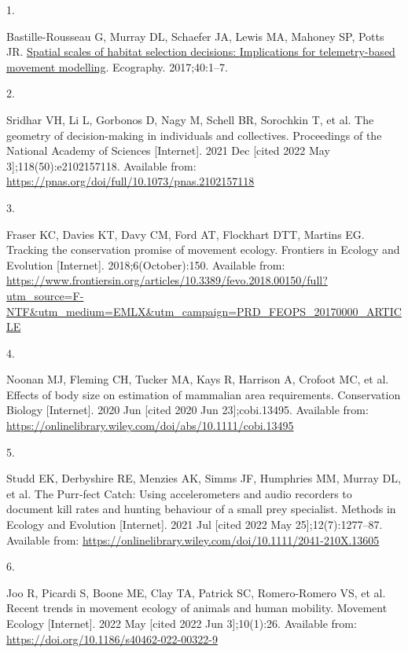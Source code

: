 \documentclass[10pt,a4paper]{article}
\newlength{\cslhangindent}
\newlength{\csllabelwidth}
\newlength{\cslentryspacingunit} %
\newenvironment{CSLReferences}[2] %
 {%
  \setlength{\parindent}{0pt}
  \ifodd #1
  \let\oldpar\par
  \def\par{\hangindent=\cslhangindent\oldpar}
  \fi
  \setlength{\parskip}{#2\cslentryspacingunit}
 }%
 {}
\newcommand{\CSLLeftMargin}[1]{\parbox[t]{\csllabelwidth}{#1}}
\newcommand{\CSLRightInline}[1]{\parbox[t]{\linewidth - \csllabelwidth}{#1}\break}
\begin{document}
\hypertarget{refs}{}
\begin{CSLReferences}{0}{0}
\leavevmode{}%
\CSLLeftMargin{1. }
\CSLRightInline{Bastille-Rousseau G, Murray DL, Schaefer JA, Lewis MA, Mahoney SP, Potts JR. \href{https://doi.org/10.1111/ecog.02655}{Spatial scales of habitat selection decisions: {Implications} for telemetry-based movement modelling}. Ecography. 2017;40:1--7. }

\leavevmode{}%
\CSLLeftMargin{2. }
\CSLRightInline{Sridhar VH, Li L, Gorbonos D, Nagy M, Schell BR, Sorochkin T, et al. The geometry of decision-making in individuals and collectives. Proceedings of the National Academy of Sciences {[}Internet{]}. 2021 Dec {[}cited 2022 May 3{]};118(50):e2102157118. Available from: \url{https://pnas.org/doi/full/10.1073/pnas.2102157118}}

\leavevmode{}%
\CSLLeftMargin{3. }
\CSLRightInline{Fraser KC, Davies KT, Davy CM, Ford AT, Flockhart DTT, Martins EG. Tracking the conservation promise of movement ecology. Frontiers in Ecology and Evolution {[}Internet{]}. 2018;6(October):150. Available from: \url{https://www.frontiersin.org/articles/10.3389/fevo.2018.00150/full?utm_source=F-NTF\&utm_medium=EMLX\&utm_campaign=PRD_FEOPS_20170000_ARTICLE}}

\leavevmode{}%
\CSLLeftMargin{4. }
\CSLRightInline{Noonan MJ, Fleming CH, Tucker MA, Kays R, Harrison A, Crofoot MC, et al. Effects of body size on estimation of mammalian area requirements. Conservation Biology {[}Internet{]}. 2020 Jun {[}cited 2020 Jun 23{]};cobi.13495. Available from: \url{https://onlinelibrary.wiley.com/doi/abs/10.1111/cobi.13495}}

\leavevmode{}%
\CSLLeftMargin{5. }
\CSLRightInline{Studd EK, Derbyshire RE, Menzies AK, Simms JF, Humphries MM, Murray DL, et al. The {Purr}‐fect {Catch}: {Using} accelerometers and audio recorders to document kill rates and hunting behaviour of a small prey specialist. Methods in Ecology and Evolution {[}Internet{]}. 2021 Jul {[}cited 2022 May 25{]};12(7):1277--87. Available from: \url{https://onlinelibrary.wiley.com/doi/10.1111/2041-210X.13605}}

\leavevmode{}%
\CSLLeftMargin{6. }
\CSLRightInline{Joo R, Picardi S, Boone ME, Clay TA, Patrick SC, Romero-Romero VS, et al. Recent trends in movement ecology of animals and human mobility. Movement Ecology {[}Internet{]}. 2022 May {[}cited 2022 Jun 3{]};10(1):26. Available from: \url{https://doi.org/10.1186/s40462-022-00322-9}}


\end{CSLReferences}
\end{document}
